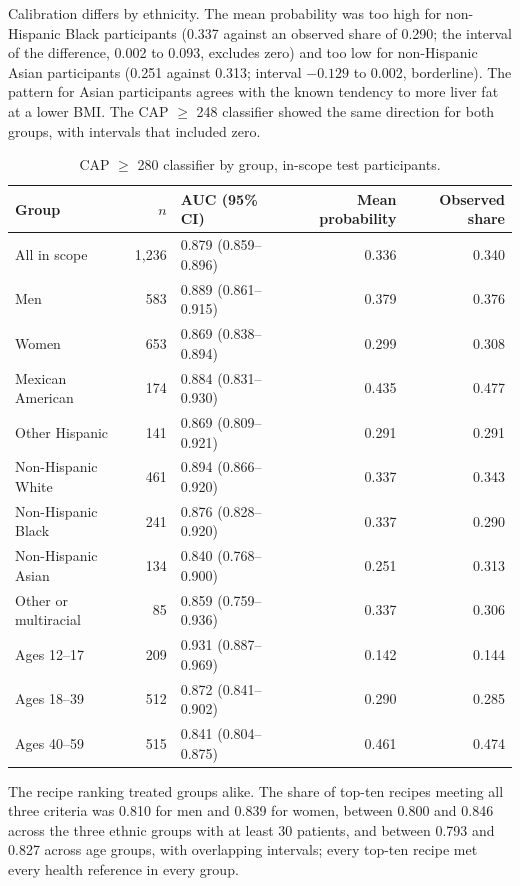 Calibration differs by ethnicity. The mean probability was too high for
non-Hispanic Black participants (0.337 against an observed share of 0.290; the
interval of the difference, 0.002 to 0.093, excludes zero) and too low for
non-Hispanic Asian participants (0.251 against 0.313; interval $-0.129$ to
0.002, borderline). The pattern for Asian participants agrees with the known
tendency to more liver fat at a lower BMI. The CAP $\geq$ 248 classifier showed
the same direction for both groups, with intervals that included zero.

\begin{table}[htbp]
\centering
\caption{CAP $\geq$ 280 classifier by group, in-scope test participants.}
\label{tab:r_fairness}
\begin{tabular}{p{4.2cm}rp{3cm}rr}
\toprule
Group & $n$ & AUC (95\% CI) & Mean probability & Observed share \\
\midrule
All in scope & 1{,}236 & 0.879 (0.859--0.896) & 0.336 & 0.340 \\
Men & 583 & 0.889 (0.861--0.915) & 0.379 & 0.376 \\
Women & 653 & 0.869 (0.838--0.894) & 0.299 & 0.308 \\
Mexican American & 174 & 0.884 (0.831--0.930) & 0.435 & 0.477 \\
Other Hispanic & 141 & 0.869 (0.809--0.921) & 0.291 & 0.291 \\
Non-Hispanic White & 461 & 0.894 (0.866--0.920) & 0.337 & 0.343 \\
Non-Hispanic Black & 241 & 0.876 (0.828--0.920) & 0.337 & 0.290 \\
Non-Hispanic Asian & 134 & 0.840 (0.768--0.900) & 0.251 & 0.313 \\
Other or multiracial & 85 & 0.859 (0.759--0.936) & 0.337 & 0.306 \\
Ages 12--17 & 209 & 0.931 (0.887--0.969) & 0.142 & 0.144 \\
Ages 18--39 & 512 & 0.872 (0.841--0.902) & 0.290 & 0.285 \\
Ages 40--59 & 515 & 0.841 (0.804--0.875) & 0.461 & 0.474 \\
\bottomrule
\end{tabular}
\end{table}

The recipe ranking treated groups alike. The share of top-ten recipes meeting
all three criteria was 0.810 for men and 0.839 for women, between 0.800 and
0.846 across the three ethnic groups with at least 30 patients, and between
0.793 and 0.827 across age groups, with overlapping intervals; every top-ten
recipe met every health reference in every group.


